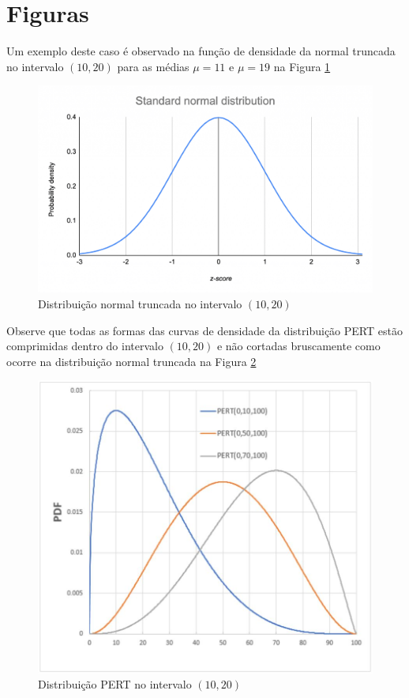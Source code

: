 \documentclass[12pt]{article}
\begin{document}
	\section{Figuras}
		\par Um exemplo deste caso é observado na função de densidade da normal truncada no intervalo $(10,20)$ para as médias $\mu=11$ e $\mu=19$ na Figura \ref{fig_normal}
		\begin{figure}[h!]
			\caption{\label{fig_normal}	Distribuição normal truncada no intervalo $(10,20)$}
			\begin{center}
				\includegraphics[scale=0.2]{normal}
			\end{center}
		\end{figure}
	
		\par Observe que todas as formas das curvas de densidade da distribuição PERT estão comprimidas dentro do intervalo $(10,20)$ e não cortadas bruscamente como ocorre na distribuição normal truncada na Figura \ref{fig_pert}
		\begin{figure}[h!]
			\caption{\label{fig_pert} Distribuição PERT no intervalo $(10,20)$}
			\begin{center}	
				\includegraphics[scale=0.2]{pert}
			\end{center}
		\end{figure}
	
\end{document}
